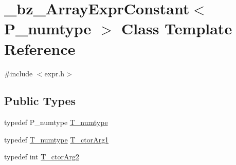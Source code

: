\hypertarget{class__bz__ArrayExprConstant}{}\section{\+\_\+bz\+\_\+\+Array\+Expr\+Constant$<$ P\+\_\+numtype $>$ Class Template Reference}
\label{class__bz__ArrayExprConstant}


{\ttfamily \#include $<$expr.\+h$>$}

\subsection*{Public Types}
\begin{DoxyCompactItemize}
\item 
typedef P\+\_\+numtype \hyperlink{class__bz__ArrayExprConstant_a7a9b5e4fa964d73b7f8b31e7977123cb}{T\+\_\+numtype}
\item 
typedef \hyperlink{class__bz__ArrayExprConstant_a7a9b5e4fa964d73b7f8b31e7977123cb}{T\+\_\+numtype} \hyperlink{class__bz__ArrayExprConstant_ac8551ed06b94b390e044fa0d514cbbe9}{T\+\_\+ctor\+Arg1}
\item 
typedef int \hyperlink{class__bz__ArrayExprConstant_a00a064bf6ba99a84a9d4ba0c801e17f9}{T\+\_\+ctor\+Arg2}
\end{DoxyCompactItemize}
